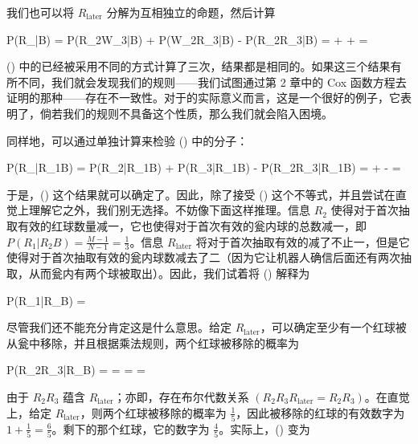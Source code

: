 我们也可以将 $R_{\text{later}}$ 分解为互相独立的命题，然后计算

\placeformula[3-61]
\startformula
\displaystyle
\startmathalignment
\NC P(R_{}|B) \NC = P(R_2W_3|B) + P(W_2R_3|B) - P(R_2R_3|B)\NR
\NC \NC = \times{} + \times{} + \times{} = \NR
\stopmathalignment
\stopformula

(\in[3-57]) 中的已经被采用不同的方式计算了三次，结果都是相同的。如果这三个结果有所不同，我们就会发现我们的规则——我们试图通过第 2 章中的 Cox 函数方程去证明的那种——存在不一致性。对于的实际意义而言，这是一个很好的例子，它表明了，倘若我们的规则不具备这个性质，那么我们就会陷入困境。

同样地，可以通过单独计算来检验 (\in[3-51]) 中的分子：

\placeformula[3-62]
\startformula
\displaystyle
\startmathalignment
\NC P(R_{}|R_1B) \NC = P(R_2|R_1B) + P(R_3|R_1B) - P(R_2R_3|R_1B)\NR
\NC \NC =  +  -  = 
\stopmathalignment
\stopformula

于是，(\in[3-57]) 这个结果就可以确定了。因此，除了接受 (\in[3-59]) 这个不等式，并且尝试在直觉上理解它之外，我们别无选择。不妨像下面这样推理。信息 $R_2$ 使得对于首次抽取有效的红球数量减一，它也使得对于首次有效的瓮内球的总数减一，即 $P(R_1|R_2B) = \frac{M - 1}{N - 1} = \frac{1}{3}$。信息 $R_{\text{later}}$ 将对于首次抽取有效的减了不止一，但是它使得对于首次抽取有效的瓮内球数减去了二（因为它让机器人确信后面还有两次抽取，从而瓮内有两个球被取出）。因此，我们试着将 (\in[3-57]) 解释为

\placeformula[3-63]
\startformula
P(R_1|R_{}B) = 
\stopformula

尽管我们还不能充分肯定这是什么意思。给定 $R_{\text{later}}$，可以确定至少有一个红球被从瓮中移除，并且根据乘法规则，两个红球被移除的概率为

\placeformula[3-64]
\startformula
\startmathalignment
\NC P(R_2R_3|R_{}B) \NC =  = \NR
\NC \NC =  = \NR
\stopmathalignment
\stopformula

由于 $R_2R_3$ 蕴含 $R_{\text{later}}$；亦即，存在布尔代数关系 $(R_2R_3R_{\text{later}} = R_2R_3)$。在直觉上，给定 $R_{\text{later}}$，则两个红球被移除的概率为 $\frac{1}{5}$，因此被移除的红球的有效数字为 $1 + \frac{1}{5} = \frac{6}{5}$。剩下的那个红球，它的数字为 $\frac{4}{5}$。实际上，(\in[3-63]) 变为

